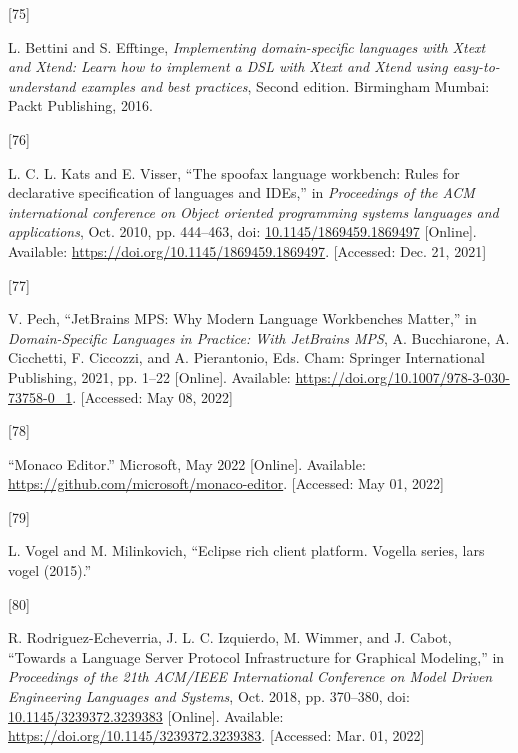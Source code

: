 \documentclass[
  a4paper,
  bibtex,
  english,
  nomenclature]{kthlatex/kththesis/kththesis}
\newlength{\cslhangindent}
\newlength{\csllabelwidth}
\newlength{\cslentryspacingunit} %
\newenvironment{CSLReferences}[2] %
 {%
  \setlength{\parindent}{0pt}
  \ifodd #1
  \let\oldpar\par
  \def\par{\hangindent=\cslhangindent\oldpar}
  \fi
  \setlength{\parskip}{#2\cslentryspacingunit}
 }%
 {}
\newcommand{\CSLLeftMargin}[1]{\parbox[t]{\csllabelwidth}{#1}}
\newcommand{\CSLRightInline}[1]{\parbox[t]{\linewidth - \csllabelwidth}{#1}\break}
\begin{document}
\begin{CSLReferences}{0}{0}
\leavevmode{}%
\CSLLeftMargin{{[}75{]} }
\CSLRightInline{L. Bettini and S. Efftinge, \emph{Implementing
domain-specific languages with {Xtext} and {Xtend}: Learn how to
implement a {DSL} with {Xtext} and {Xtend} using easy-to-understand
examples and best practices}, Second edition. {Birmingham Mumbai}:
{Packt Publishing}, 2016. }

\leavevmode{}%
\CSLLeftMargin{{[}76{]} }
\CSLRightInline{L. C. L. Kats and E. Visser, {``The spoofax language
workbench: Rules for declarative specification of languages and
{IDEs},''} in \emph{Proceedings of the {ACM} international conference on
{Object} oriented programming systems languages and applications}, Oct.
2010, pp. 444--463, doi:
\href{https://doi.org/10.1145/1869459.1869497}{10.1145/1869459.1869497}
{[}Online{]}. Available: \url{https://doi.org/10.1145/1869459.1869497}.
{[}Accessed: Dec. 21, 2021{]}}

\leavevmode{}%
\CSLLeftMargin{{[}77{]} }
\CSLRightInline{V. Pech, {``{JetBrains MPS}: {Why Modern Language
Workbenches Matter},''} in \emph{Domain-{Specific Languages} in
{Practice}: With {JetBrains MPS}}, A. Bucchiarone, A. Cicchetti, F.
Ciccozzi, and A. Pierantonio, Eds. {Cham}: {Springer International
Publishing}, 2021, pp. 1--22 {[}Online{]}. Available:
\url{https://doi.org/10.1007/978-3-030-73758-0_1}. {[}Accessed: May 08,
2022{]}}

\leavevmode{}%
\CSLLeftMargin{{[}78{]} }
\CSLRightInline{{``Monaco {Editor}.''} Microsoft, May 2022 {[}Online{]}.
Available: \url{https://github.com/microsoft/monaco-editor}.
{[}Accessed: May 01, 2022{]}}

\leavevmode{}%
\CSLLeftMargin{{[}79{]} }
\CSLRightInline{L. Vogel and M. Milinkovich, {``Eclipse rich client
platform. {Vogella} series, lars vogel (2015).''} }

\leavevmode{}%
\CSLLeftMargin{{[}80{]} }
\CSLRightInline{R. Rodriguez-Echeverria, J. L. C. Izquierdo, M. Wimmer,
and J. Cabot, {``Towards a {Language Server Protocol Infrastructure} for
{Graphical Modeling},''} in \emph{Proceedings of the 21th {ACM}/{IEEE
International Conference} on {Model Driven Engineering Languages} and
{Systems}}, Oct. 2018, pp. 370--380, doi:
\href{https://doi.org/10.1145/3239372.3239383}{10.1145/3239372.3239383}
{[}Online{]}. Available: \url{https://doi.org/10.1145/3239372.3239383}.
{[}Accessed: Mar. 01, 2022{]}}


\end{CSLReferences}
\end{document}
